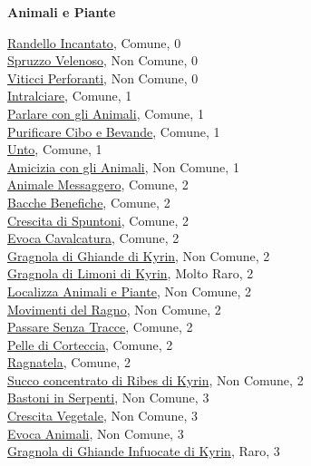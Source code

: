 \begin{multicols}{3}
{{\medskip\textbf{Animali e Piante}

\hyperlink{Randello Incantato}{Randello Incantato}, Comune, 0\\
\hyperlink{Spruzzo Velenoso}{Spruzzo Velenoso}, Non Comune, 0\\
\hyperlink{Viticci Perforanti}{Viticci Perforanti}, Non Comune, 0\\
\hyperlink{Intralciare}{Intralciare}, Comune, 1\\
\hyperlink{Parlare con gli Animali}{Parlare con gli Animali}, Comune, 1\\
\hyperlink{Purificare Cibo e Bevande}{Purificare Cibo e Bevande}, Comune, 1\\
\hyperlink{Unto}{Unto}, Comune, 1\\
\hyperlink{Amicizia con gli Animali}{Amicizia con gli Animali}, Non Comune, 1\\
\hyperlink{Animale Messaggero}{Animale Messaggero}, Comune, 2\\
\hyperlink{Bacche Benefiche}{Bacche Benefiche}, Comune, 2\\
\hyperlink{Crescita di Spuntoni}{Crescita di Spuntoni}, Comune, 2\\
\hyperlink{Evoca Cavalcatura}{Evoca Cavalcatura}, Comune, 2\\
\hyperlink{Gragnola di Ghiande di Kyrin}{Gragnola di Ghiande di Kyrin}, Non Comune, 2\\
\hyperlink{Gragnola di Limoni di Kyrin}{Gragnola di Limoni di Kyrin}, Molto Raro, 2\\
\hyperlink{Localizza Animali e Piante}{Localizza Animali e Piante}, Non Comune, 2\\
\hyperlink{Movimenti del Ragno}{Movimenti del Ragno}, Non Comune, 2\\
\hyperlink{Passare Senza Tracce}{Passare Senza Tracce}, Comune, 2\\
\hyperlink{Pelle di Corteccia}{Pelle di Corteccia}, Comune, 2\\
\hyperlink{Ragnatela}{Ragnatela}, Comune, 2\\
\hyperlink{Succo concentrato di Ribes di Kyrin}{Succo concentrato di Ribes di Kyrin}, Non Comune, 2\\
\hyperlink{Bastoni in Serpenti}{Bastoni in Serpenti}, Non Comune, 3\\
\hyperlink{Crescita Vegetale}{Crescita Vegetale}, Non Comune, 3\\
\hyperlink{Evoca Animali}{Evoca Animali}, Non Comune, 3\\
\hyperlink{Gragnola di Ghiande Infuocate di Kyrin}{Gragnola di Ghiande Infuocate di Kyrin}, Raro, 3\\
}}
\end{multicols}
